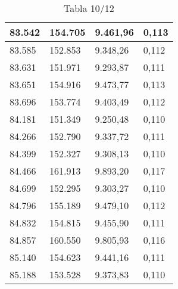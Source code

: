 \begin{table}[H]
{\begin{tabular}{| l | l | l |l |}
83.542	&	154.705	&	9.461,96	&	0,113	\\ \hline
83.585	&	152.853	&	9.348,26	&	0,112	\\ \hline
83.631	&	151.971	&	9.293,87	&	0,111	\\ \hline
83.651	&	154.916	&	9.473,77	&	0,113	\\ \hline
83.696	&	153.774	&	9.403,49	&	0,112	\\ \hline
84.181	&	151.349	&	9.250,48	&	0,110	\\ \hline
84.266	&	152.790	&	9.337,72	&	0,111	\\ \hline
84.399	&	152.327	&	9.308,13	&	0,110	\\ \hline
84.466	&	161.913	&	9.893,20	&	0,117	\\ \hline
84.699	&	152.295	&	9.303,27	&	0,110	\\ \hline
84.796	&	155.189	&	9.479,10	&	0,112	\\ \hline
84.832	&	154.815	&	9.455,90	&	0,111	\\ \hline
84.857	&	160.550	&	9.805,93	&	0,116	\\ \hline
85.140	&	154.623	&	9.441,16	&	0,111	\\ \hline
85.188	&	153.528	&	9.373,83	&	0,110	\\ \hline
  \end{tabular}
  \caption*{Tabla 10/12}
}
\end{table}
